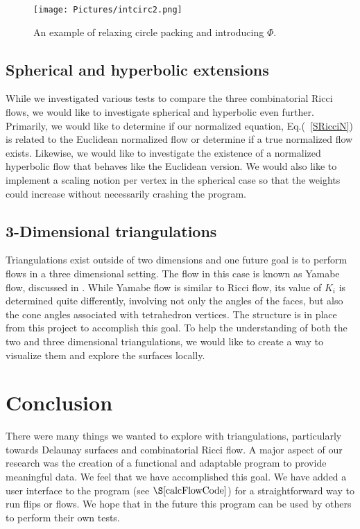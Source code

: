 \documentclass[12pt]{article}
\begin{document}
\begin{figure}
\begin{center}
\texttt{[image: Pictures/intcirc2.png]}
\end{center}
\caption{An example of relaxing circle packing and introducing $\Phi.$}
\label{fig:intcirc}
\end{figure}

\subsection{Spherical and hyperbolic extensions}
While we investigated various tests to compare the three combinatorial Ricci flows, we would like to investigate spherical and hyperbolic even further. Primarily, we would like to determine if our normalized equation, Eq.(~\ref{SRicciN}) is related to the Euclidean normalized flow or determine if a true normalized flow exists. Likewise, we would like to investigate the existence of a normalized hyperbolic flow that behaves like the Euclidean version. We would also like to implement a scaling notion per vertex in the spherical case so that the weights could increase without necessarily crashing the program. 

\subsection{3-Dimensional triangulations}
Triangulations exist outside of two dimensions and one future goal is to perform flows in a three dimensional setting. The flow in this case is known as Yamabe flow, discussed in \cite{DrG}. While Yamabe flow is similar to Ricci flow, its value of $K_i$ is determined quite differently, involving not only the angles of the faces, but also the cone angles associated with tetrahedron vertices. The structure is in place from this project to accomplish this goal. To help the understanding of both the two and three dimensional triangulations, we would like to create a way to visualize them and explore the surfaces locally.

\section{Conclusion}

There were many things we wanted to explore with triangulations, particularly towards Delaunay surfaces and combinatorial Ricci flow. A major aspect of our research was the creation of a functional and adaptable program to provide meaningful data. We feel that we have accomplished this goal. We have added a user interface to the program (see $\S\ref{calcFlowCode}$) for a straightforward way to run flips or flows. We hope that in the future this program can be used by others to perform their own tests.
\end{document}

